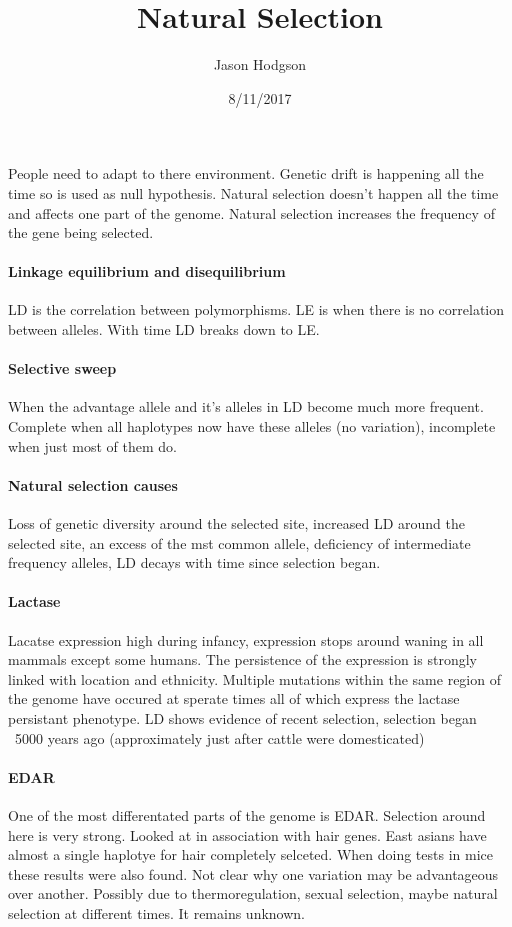 \documentclass[11pt]{article}
\title{Natural Selection}
\author{Jason Hodgson}
\date{8/11/2017}
\begin{document}
\maketitle
People need to adapt to there environment. Genetic drift is happening all the time so is used as null hypothesis. Natural selection doesn't happen all the time and affects one part of the genome. Natural selection increases the frequency of the gene being selected.
\paragraph{Linkage equilibrium and disequilibrium}
LD is the correlation between polymorphisms. LE is when there is no correlation between alleles. With time LD breaks down to LE.
\paragraph{Selective sweep}
When the advantage allele and it's alleles in LD become much more frequent. Complete when all haplotypes now have these alleles (no variation), incomplete  when just most of them do.
\paragraph{Natural selection causes}
Loss of genetic diversity around the selected site, increased LD around the selected site, an excess of the mst common allele, deficiency of intermediate frequency alleles, LD decays with time since selection began.
\paragraph{Lactase}
Lacatse expression high during infancy, expression stops around waning in all mammals except some humans. The persistence of the expression is strongly linked with location and ethnicity. Multiple mutations within the same region of the genome have occured at sperate times all of which express the lactase persistant phenotype. LD shows evidence of recent selection, selection began ~5000 years ago (approximately just after cattle were domesticated)
\paragraph{EDAR}
One of the most differentated parts of the genome is EDAR. Selection around here is very strong. Looked at in association with hair genes. East asians have almost a single haplotye for hair completely selceted. When doing tests in mice these results were also found. Not clear why one variation may  be advantageous over another. Possibly due to thermoregulation, sexual selection, maybe natural selection at different times. It remains unknown.
\end{document}
